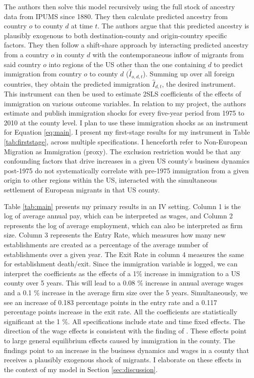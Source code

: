     The authors then solve this model recursively using the full stock of ancestry data from IPUMS since 1880. They then calculate predicted ancestry from country $o$ to county $d$ at time $t$. The authors argue that this predicted ancestry is plausibly exogenous to both destination-county and origin-country specific factors. They then follow a shift-share approach by interacting predicted ancestry from a country $o$ in county $d$ with the contemporaneous inflow of migrants from said country $o$ into regions of the US other than the one containing $d$ to predict immigration from country $o$ to county $d$ ($\hat{I}_{o,d,t}$). Summing up over all foreign countries, they obtain the predicted immigration $\hat{I}_{d,t}$, the desired instrument. This instrument can then be used to estimate 2SLS coefficients of the effects of immigration on various outcome variables. In relation to my project, the authors estimate and publish immigration shocks for every five-year period from 1975 to 2010 at the county level. I plan to use these immigration shocks as an instrument for Equation \eqref{eq:main}. I present my first-stage results for my instrument in Table \ref{tab:firststage}, across multiple specifications. I henceforth refer to Non-European Migration as Immigration (proxy). The exclusion restriction would be that any confounding factors that drive increases in a given US county’s business dynamics post-1975 do not systematically correlate with pre-1975 immigration from a given origin to other regions within the US, interacted with the simultaneous settlement of European migrants in that US county.

    Table \ref{tab:main} presents my primary results in an IV setting. Column 1 is the log of average annual pay, which can be interpreted as wages, and Column 2 represents the log of average employment, which can also be interpreted as firm size. Column 3 represents the Entry Rate, which measures how many new establishments are created as a percentage of the average number of establishments over a given year. The Exit Rate in column 4 measures the same for establishment death/exit. Since the immigration variable is logged, we can interpret the coefficients as the effects of a 1\% increase in immigration to a US county over 5 years. This will lead to a 0.08 \% increase in annual average wages and a 0.1 \% increase in the average firm size over the 5 years. Simultaneously, we see an increase of 0.183 percentage points in the entry rate and a 0.117 percentage points increase in the exit rate. All the coefficients are statistically significant at the 1 \%. All specifications include state and time fixed effects. The direction of the wage effects is consistent with the finding of \cite{ImmigrationInnovationGrowth}. These effects point to large general equilibrium effects caused by immigration in the county. The findings point to an increase in the business dynamics and wages in a county that receives a plausibly exogenous shock of migrants. I elaborate on these effects in the context of my model in Section \ref{sec:discussion}.
    
